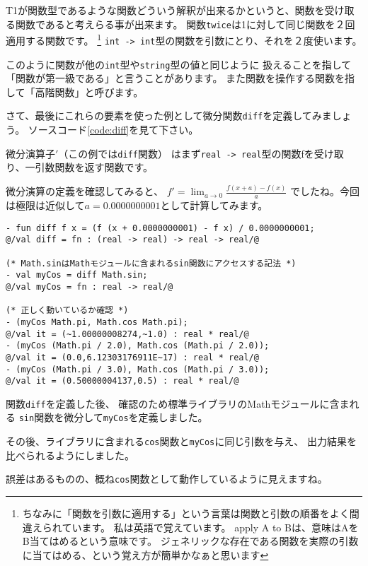 \documentclass[11pt,a4paper]{article}
\begin{document}
T1が関数型であるような関数どういう解釈が出来るかというと、関数を受け取る関数であると考えらる事が出来ます。
関数\lstinline{twice}は1に対して同じ関数を２回適用する関数です。
\footnote{
ちなみに「関数を引数に適用する」という言葉は関数と引数の順番をよく間違えられています。
私は英語で覚えています。
apply A to Bは、意味はAをB当てはめるという意味です。
ジェネリックな存在である関数を実際の引数に当てはめる、という覚え方が簡単かなぁと思います}
\lstinline{int -> int}型の関数を引数にとり、それを２度使います。

このように関数が他の\lstinline{int}型や\lstinline{string}型の値と同じように
扱えることを指して「関数が第一級である」と言うことがあります。
また関数を操作する関数を指して「高階関数」と呼びます。

さて、最後にこれらの要素を使った例として微分関数\lstinline{diff}を定義してみましょう。
ソースコード\ref{code:diff}を見て下さい。

微分演算子$'$（この例では\lstinline{diff}関数）
はまず\lstinline{real -> real}型の関数fを受け取り、一引数関数を返す関数です。

微分演算の定義を確認してみると、
$f' = \lim_{a \to 0}\frac{f(x+a) - f(x)}{a}$
でしたね。今回は極限は近似して$a = 0.0000000001$として計算してみます。

\begin{lstlisting}[caption=高階関数の例,label=code:diff]
- fun diff f x = (f (x + 0.0000000001) - f x) / 0.0000000001;
@/val diff = fn : (real -> real) -> real -> real/@

(* Math.sinはMathモジュールに含まれるsin関数にアクセスする記法 *)
- val myCos = diff Math.sin;
@/val myCos = fn : real -> real/@

(* 正しく動いているか確認 *)
- (myCos Math.pi, Math.cos Math.pi);
@/val it = (~1.00000008274,~1.0) : real * real/@
- (myCos (Math.pi / 2.0), Math.cos (Math.pi / 2.0));
@/val it = (0.0,6.12303176911E~17) : real * real/@
- (myCos (Math.pi / 3.0), Math.cos (Math.pi / 3.0));
@/val it = (0.50000004137,0.5) : real * real/@
\end{lstlisting}

関数\lstinline{diff}を定義した後、
確認のため標準ライブラリのMathモジュールに含まれる
\lstinline{sin}関数を微分して\lstinline{myCos}を定義しました。

その後、ライブラリに含まれる\lstinline{cos}関数と\lstinline{myCos}に同じ引数を与え、
出力結果を比べられるようにしました。

誤差はあるものの、概ね\lstinline{cos}関数として動作しているように見えますね。
\end{document}
